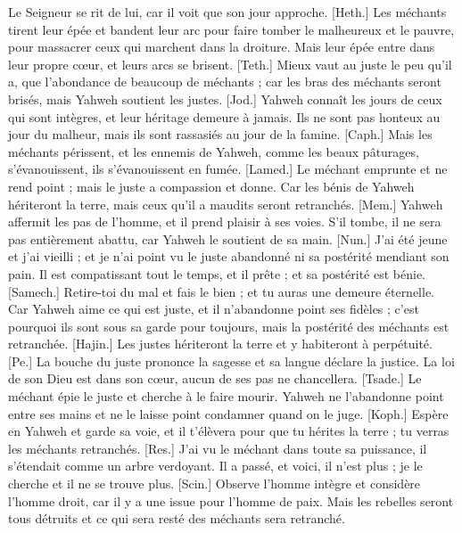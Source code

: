 \begin{multicols}{2}
Le Seigneur se rit de lui, car il voit que son jour approche.
[Heth.] Les méchants tirent leur épée et bandent leur arc pour faire tomber le malheureux et le pauvre, pour massacrer ceux qui marchent dans la droiture.
Mais leur épée entre dans leur propre cœur, et leurs arcs se brisent.
[Teth.] Mieux vaut au juste le peu qu'il a, que l'abondance de beaucoup de méchants ;
car les bras des méchants seront brisés, mais Yahweh soutient les justes.
[Jod.] Yahweh connaît les jours de ceux qui sont intègres, et leur héritage demeure à jamais.
Ils ne sont pas honteux au jour du malheur, mais ils sont rassasiés au jour de la famine.
[Caph.] Mais les méchants périssent, et les ennemis de Yahweh, comme les beaux pâturages, s'évanouissent, ils s’évanouissent en fumée.
[Lamed.] Le méchant emprunte et ne rend point ; mais le juste a compassion et donne.
Car les bénis de Yahweh hériteront la terre, mais ceux qu'il a maudits seront retranchés.
[Mem.] Yahweh affermit les pas de l’homme, et il prend plaisir à ses voies.
S'il tombe, il ne sera pas entièrement abattu, car Yahweh le soutient de sa main.
[Nun.] J'ai été jeune et j'ai vieilli ; et je n'ai point vu le juste abandonné ni sa postérité mendiant son pain.
Il est compatissant tout le temps, et il prête ; et sa postérité est bénie.
[Samech.] Retire-toi du mal et fais le bien ; et tu auras une demeure éternelle.
Car Yahweh aime ce qui est juste, et il n'abandonne point ses fidèles ; c'est pourquoi ils sont sous sa garde pour toujours, mais la postérité des méchants est retranchée.
[Hajin.] Les justes hériteront la terre et y habiteront à perpétuité.
[Pe.] La bouche du juste prononce la sagesse et sa langue déclare la justice.
La loi de son Dieu est dans son cœur, aucun de ses pas ne chancellera.
[Tsade.] Le méchant épie le juste et cherche à le faire mourir.
Yahweh ne l'abandonne point entre ses mains et ne le laisse point condamner quand on le juge.
[Koph.] Espère en Yahweh et garde sa voie, et il t’élèvera pour que tu hérites la terre ; tu verras les méchants retranchés.
[Res.] J'ai vu le méchant dans toute sa puissance, il s’étendait comme un arbre verdoyant.
Il a passé, et voici, il n'est plus ; je le cherche et il ne se trouve plus.
[Scin.] Observe l'homme intègre et considère l'homme droit, car il y a une issue pour l’homme de paix.
Mais les rebelles seront tous détruits et ce qui sera resté des méchants sera retranché.

\end{multicols}
